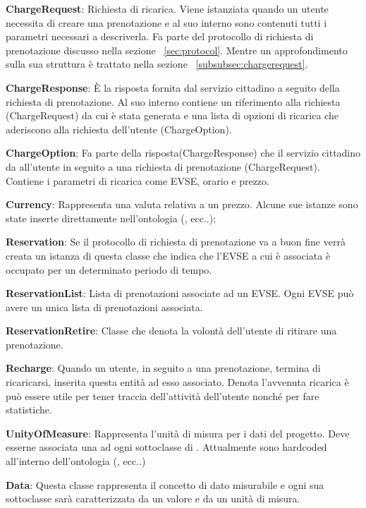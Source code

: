 \begin{description}
	\item \textbf{ChargeRequest}: Richiesta di ricarica. Viene istanziata quando un utente necessita di creare una prenotazione e al suo interno sono contenuti tutti i parametri necessari a descriverla. Fa parte del protocollo di richiesta di prenotazione discusso nella sezione ~\ref{sec:protocol}. Mentre un approfondimento sulla sua struttura è trattato nella sezione ~\ref{subsubsec:chargerequest}.
	\item \textbf{ChargeResponse}: È la risposta fornita dal servizio cittadino a seguito della richiesta di prenotazione. Al suo interno contiene un riferimento alla richiesta (ChargeRequest) da cui è stata generata e una lista di opzioni di ricarica che aderiscono alla richiesta dell'utente (ChargeOption).
	\item \textbf{ChargeOption}: Fa parte della risposta(ChargeResponse) che il servizio cittadino da all'utente in seguito a una richiesta di prenotazione (ChargeRequest). Contiene i parametri di ricarica come EVSE, orario e prezzo. 
	\item \textbf{Currency}: Rappresenta una valuta relativa a un prezzo. Alcune sue istanze sono state inserte direttamente nell'ontologia (,  ecc..);
	\item \textbf{Reservation}: Se il protocollo di richiesta di prenotazione va a buon fine verrà creata un istanza di questa classe che indica che l'EVSE a cui è associata è occupato per un determinato periodo di tempo. 
	\item \textbf{ReservationList}: Lista di prenotazioni associate ad un EVSE. Ogni EVSE può avere un unica lista di prenotazioni associata.
	\item \textbf{ReservationRetire}: Classe che denota la volontà dell'utente di ritirare una prenotazione.
	\item \textbf{Recharge}: Quando un utente, in seguito a una prenotazione, termina di ricaricarsi, inserita questa entità ad esso associato. Denota l'avvenuta ricarica è può essere utile per tener traccia dell'attività dell'utente nonché per fare statistiche.
	\item \textbf{UnityOfMeasure}: Rappresenta l'unità di misura per i dati del progetto. Deve esserne associata una ad ogni sottoclasse di . Attualmente sono hardcoded all'interno dell'ontologia (,  ecc..) 	
	\item \textbf{Data}: Questa classe rappresenta il concetto di dato misurabile e ogni sua sottoclasse sarà caratterizzata da un valore e da un unità di misura.
\end{description}


